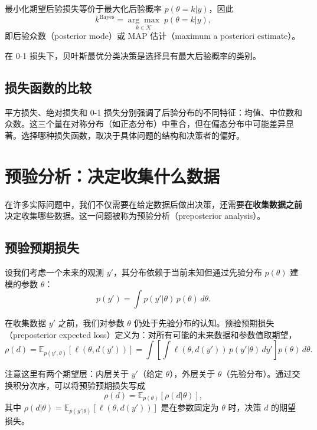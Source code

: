 最小化期望后验损失等价于最大化后验概率 $p(\theta = k | y)$，因此
\[
k^{\text{Bayes}} = \underset{k \in \mathcal{K}}{\arg\max} \; p(\theta = k | y),
\]
即后验众数（posterior mode）或 MAP 估计（maximum a posteriori estimate）。

\begin{Theorem}[0-1 损失下的贝叶斯最优分类]\label{th:zero-one-loss-bayes}
  在 0-1 损失下，贝叶斯最优分类决策是选择具有最大后验概率的类别。
\end{Theorem}

\subsection{损失函数的比较}

\begin{Remark}
  平方损失、绝对损失和 0-1 损失分别强调了后验分布的不同特征：均值、中位数和众数。这三个量在对称分布（如正态分布）中重合，但在偏态分布中可能差异显著。选择哪种损失函数，取决于具体问题的结构和决策者的偏好。
\end{Remark}

\section{预验分析：决定收集什么数据}

在许多实际问题中，我们不仅需要在给定数据后做出决策，还需要\textbf{在收集数据之前}决定收集哪些数据。这一问题被称为预验分析（preposterior analysis）。

\subsection{预验预期损失}

设我们考虑一个未来的观测 $y'$，其分布依赖于当前未知但通过先验分布 $p(\theta)$ 建模的参数 $\theta$：
\[
p(y') = \int p(y' | \theta) \, p(\theta) \, d\theta.
\]

在收集数据 $y'$ 之前，我们对参数 $\theta$ 仍处于先验分布的认知。预验预期损失（preposterior expected loss）定义为：对所有可能的未来数据和参数值取期望，
\[
\rho(d) = \mathbb{E}_{p(y', \theta)}[\ell(\theta, d(y'))] = \int \left[ \int \ell(\theta, d(y')) \, p(y' | \theta) \, dy' \right] p(\theta) \, d\theta.
\]

注意这里有两个期望层：内层关于 $y'$（给定 $\theta$），外层关于 $\theta$（先验分布）。通过交换积分次序，可以将预验预期损失写成
\[
\rho(d) = \mathbb{E}_{p(\theta)}[\rho(d | \theta)],
\]
其中 $\rho(d | \theta) = \mathbb{E}_{p(y'|\theta)}[\ell(\theta, d(y'))]$ 是在参数固定为 $\theta$ 时，决策 $d$ 的期望损失。

